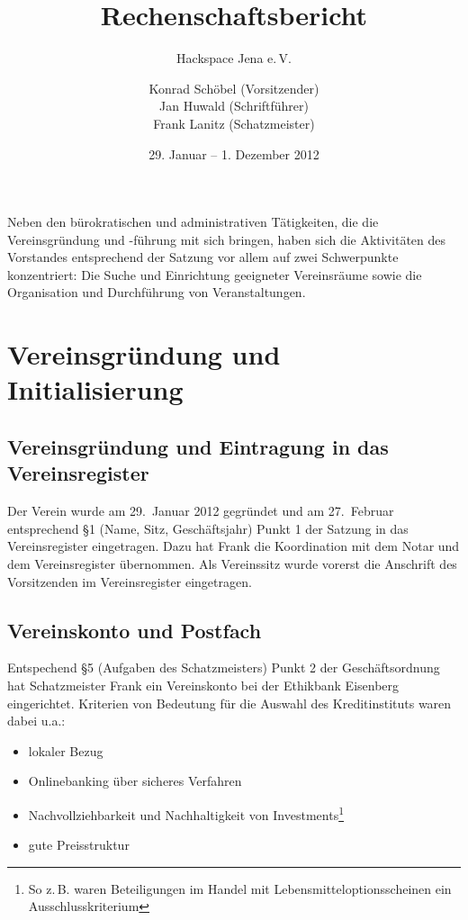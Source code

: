 \documentclass[10pt,DIV16]{scrartcl}
\title{Rechenschaftsbericht}
\subtitle{Hackspace Jena e.\,V.}
\author{%
	Konrad Schöbel (Vorsitzender)\\
	Jan Huwald (Schriftf\"uhrer)\\
	Frank Lanitz (Schatzmeister)
}
\date{29. Januar -- 1. Dezember 2012}
\begin{document}
\maketitle{}

\tableofcontents{}

\newpage{}

Neben den bürokratischen und administrativen Tätigkeiten, die die
Vereinsgründung und -führung mit sich bringen, haben sich die Aktivitäten des
Vorstandes entsprechend der Satzung vor allem auf zwei Schwerpunkte
konzentriert: Die Suche und Einrichtung geeigneter Vereinsräume sowie die
Organisation und Durchführung von Veranstaltungen.


\section{Vereinsgründung und Initialisierung}

\subsection{Vereinsgründung und Eintragung in das Vereinsregister}

Der Verein wurde am 29.~Januar 2012 gegründet und am 27.~Februar
entsprechend §1 (Name, Sitz, Geschäftsjahr) Punkt 1 der Satzung in
das Vereinsregister eingetragen. Dazu hat Frank die Koordination mit
dem Notar und dem Vereinsregister übernommen. Als Vereinssitz wurde
vorerst die Anschrift des Vorsitzenden im Vereinsregister
eingetragen.

\subsection{Vereinskonto und Postfach}

Entspechend §5 (Aufgaben des Schatzmeisters) Punkt 2 der Geschäftsordnung hat
Schatzmeister Frank ein Vereinskonto bei der Ethikbank Eisenberg eingerichtet.
Kriterien von Bedeutung für die Auswahl des Kreditinstituts waren dabei u.a.:

\begin{itemize}
	\item lokaler Bezug
	\item Onlinebanking über sicheres Verfahren
	\item Nachvollziehbarkeit und Nachhaltigkeit von Investments\footnote{So
		z.\,B. waren Beteiligungen im Handel mit Lebensmitteloptionsscheinen
		ein Ausschlusskriterium}
	\item gute Preisstruktur
\end{itemize}
\end{document}
